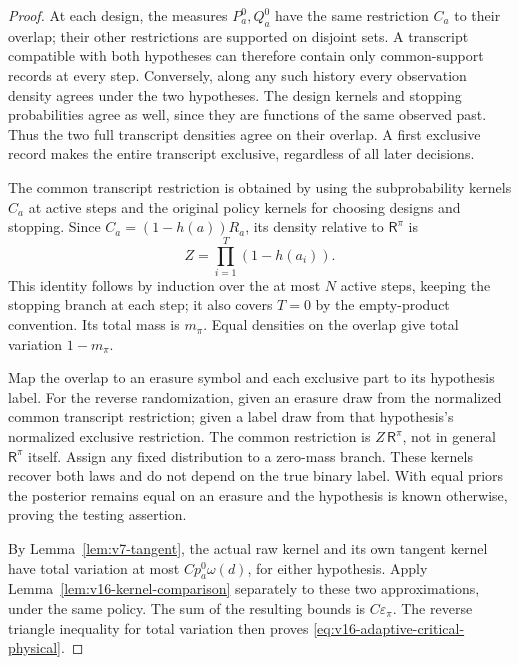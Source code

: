 \begin{proof}
At each design, the measures $P_a^0,Q_a^0$ have the same restriction
$C_a$ to their overlap; their other restrictions are supported on disjoint
sets. A transcript compatible with both hypotheses can therefore contain
only common-support records at every step. Conversely, along any such
history every observation density agrees under the two hypotheses.
The design kernels and stopping probabilities agree as well, since
they are functions of the same observed past. Thus the two full transcript
densities agree on their overlap. A first exclusive record makes the
entire transcript exclusive, regardless of all later decisions.

The common transcript restriction is obtained by using the
subprobability kernels $C_a$ at active steps and the original policy
kernels for choosing designs and stopping. Since
$C_a=(1-h(a))R_a$, its density relative to $\mathsf R^\pi$ is
\[
                         Z=\prod_{i=1}^{T}(1-h(a_i)).
\]
This identity follows by induction over the at most $N$ active steps,
keeping the stopping branch at each step; it also covers $T=0$ by the
empty-product convention. Its total mass is $m_\pi$. Equal densities
on the overlap give total variation $1-m_\pi$.

Map the overlap to an erasure symbol and each exclusive part to its
hypothesis label. For the reverse randomization, given an erasure draw
from the normalized common transcript restriction; given a label draw
from that hypothesis's normalized exclusive restriction. The common
restriction is $Z\,\mathsf R^\pi$, not in general $\mathsf R^\pi$
itself. Assign any fixed distribution to a zero-mass branch. These
kernels recover both laws and do not depend on the true binary label.
With equal priors the posterior remains equal on an erasure and the
hypothesis is known otherwise, proving the testing assertion.

By Lemma~\ref{lem:v7-tangent}, the actual raw kernel and its own
tangent kernel have total variation at most $Cp_a^0\omega(d)$, for
either hypothesis. Apply Lemma~\ref{lem:v16-kernel-comparison}
separately to these two approximations, under the same policy.
The sum of the resulting bounds is $C\varepsilon_\pi$. The reverse
triangle inequality for total variation then proves
\eqref{eq:v16-adaptive-critical-physical}.
\end{proof}

